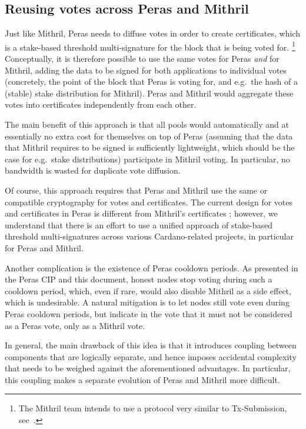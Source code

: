 \subsection{Reusing votes across Peras and Mithril}\label{sec:mithril reuse votes}
Just like Mithril, Peras needs to diffuse votes in order to create certificates, which is a stake-based threshold multi-signature for the block that is being voted for.%
\footnote{The Mithril team intends to use a protocol very similar to Tx-Submission, see~\cite{dmq-cip}.}
Conceptually, it is therefore possible to use the same votes for Peras \emph{and} for Mithril, adding the data to be signed for both applications to individual votes (concretely, the point of the block that Peras is voting for, and e.g.\ the hash of a (stable) stake distribution for Mithril).
Peras and Mithril would aggregate these votes into certificates independently from each other.

The main benefit of this approach is that all pools would automatically and at essentially no extra cost for themselves on top of Peras (assuming that the data that Mithril requires to be signed is sufficiently lightweight, which should be the case for e.g.\ stake distributions) participate in Mithril voting.
In particular, no bandwidth is wasted for duplicate vote diffusion.

Of course, this approach requires that Peras and Mithril use the same or compatible cryptography for votes and certificates.
The current design for votes and certificates in Peras \parencite{peras-cert-report} is different from Mithril's certificates \parencite{chaidos2024mithril}; however, we understand that there is an effort to use a unified approach of stake-based threshold multi-signatures across various Cardano-related projects, in particular for Peras and Mithril.

Another complication is the existence of Peras cooldown periods.
As presented in the Peras CIP \parencite{peras-cip} and this document, honest nodes stop voting during such a cooldown period, which, even if rare, would also disable Mithril as a side effect, which is undesirable.
A natural mitigation is to let nodes still vote even during Peras cooldown periods, but indicate in the vote that it must not be considered as a Peras vote, only as a Mithril vote.

In general, the main drawback of this idea is that it introduces coupling between components that are logically separate, and hence imposes accidental complexity that needs to be weighed against the aforementioned advantages.
In particular, this coupling makes a separate evolution of Peras and Mithril more difficult.

